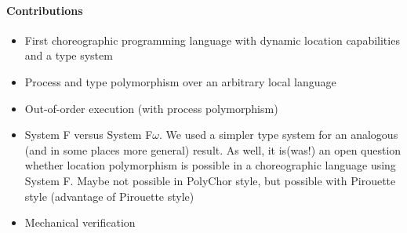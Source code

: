 \paragraph{Contributions}
\begin{itemize}
	\item First choreographic programming language with dynamic location capabilities and a type system
	\item Process and type polymorphism over an arbitrary local language
	\item Out-of-order execution (with process polymorphism)
	\item System F versus System F$\omega$. We used a simpler type system for an analogous (and in some places more general) result. As well, it is(was!) an open question whether location polymorphism is possible in a choreographic language using System F. Maybe not possible in PolyChor style, but possible with Pirouette style (advantage of Pirouette style)
	\item Mechanical verification
\end{itemize}


